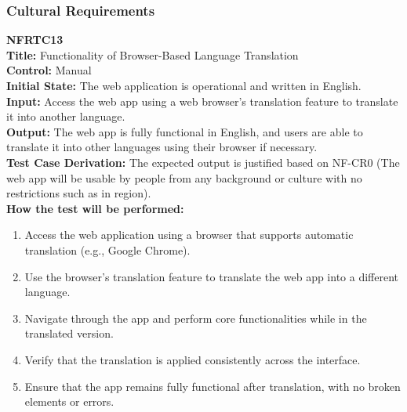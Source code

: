 \documentclass[12pt, titlepage]{article}
\begin{document}
\subsubsection{Cultural Requirements}
\textbf{NFRTC13}\\
\textbf{Title:} Functionality of Browser-Based Language Translation\\
\textbf{Control:} Manual\\
\textbf{Initial State:} The web application is operational and written in English.\\
\textbf{Input:} Access the web app using a web browser's translation feature to translate it into another language.\\
\textbf{Output:} The web app is fully functional in English, and users are able to translate it into other languages using their browser if necessary.\\
\textbf{Test Case Derivation:} The expected output is justified based on NF-CR0 (The web app will be usable by people from any background or culture with no restrictions such as in region).\\
\textbf{How the test will be performed:}
\begin{enumerate}
  \item Access the web application using a browser that supports automatic translation (e.g., Google Chrome).
  \item Use the browser's translation feature to translate the web app into a different language.
  \item Navigate through the app and perform core functionalities while in the translated version.
  \item Verify that the translation is applied consistently across the interface.
  \item Ensure that the app remains fully functional after translation, with no broken elements or errors.
\end{enumerate}
\vspace{1em}
\end{document}
